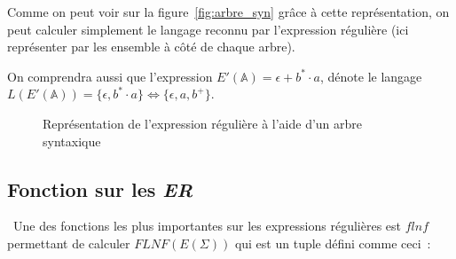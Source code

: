 \documentclass[12pt]{article}
\begin{document}
Comme on peut voir sur la figure~\ref{fig:arbre_syn} grâce à cette
représentation, on peut calculer simplement le langage reconnu par l'expression
régulière (ici représenter par les ensemble à côté de chaque arbre).

\vphantom{}

On comprendra aussi que l'expression \(E'(\mathbb{A}) = \epsilon + b^* \cdot
a\), dénote le langage \(L(E'(\mathbb{A})) = \{\epsilon, b^* \cdot a\}
\Leftrightarrow \{\epsilon, a, b^+\}\).

\begin{figure}[H]
    \centering
    \caption{
        Représentation de l'expression régulière à l'aide d'un arbre syntaxique
    }
\end{figure}

\subsection{Fonction sur les \textit{ER}}

\textbullet~Une des fonctions les plus importantes sur les expressions régulières
est \(flnf\) permettant de calculer \(FLNF(E(\Sigma))\) qui est un tuple défini
comme ceci~:

\vphantom{}
\end{document}
